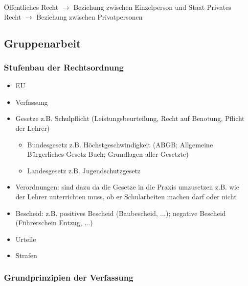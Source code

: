\documentclass[a4paper]{report}
\begin{document}
Öffentliches Recht  $\rightarrow$ Beziehung zwischen Einzelperson und Staat
\newline
Privates Recht $\rightarrow$ Beziehung zwischen Privatpersonen

\subsection{Gruppenarbeit}

\subsubsection{Stufenbau der Rechtsordnung}

\begin{itemize}
\item EU
\item Verfassung
\item Gesetze z.B. Schulpflicht (Leistungsbeurteilung, Recht auf Benotung, Pflicht der Lehrer)

	\begin{itemize}
	\item Bundesgesetz z.B. Höchstgeschwindigkeit (ABGB; Allgemeine Bürgerliches Gesetz Buch; Grundlagen aller Gesetzte)
	\item Landesgesetz z.B. Jugendschutzgesetz
	\end{itemize}

\item Verordnungen: sind dazu da die Gesetze in die Praxis umzusetzen z.B. wie der Lehrer unterrichten muss, ob er Schularbeiten machen darf oder nicht
\item Bescheid: z.B. positives Bescheid (Baubescheid, ...); negative Bescheid (Führerschein Entzug, ...)
\item Urteile
\item Strafen
\end{itemize}

\subsubsection{Grundprinzipien der Verfassung}
\end{document}
